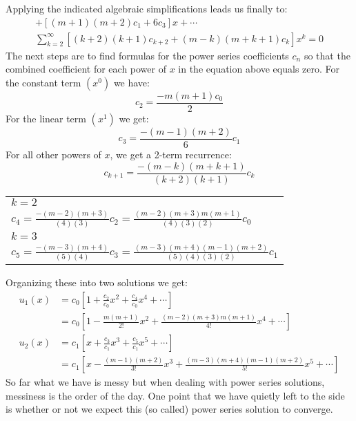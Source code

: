 Applying the indicated algebraic simplifications leads us finally to:
\begin{multline*}
[m(m+1)c_0+2c_2] + [(m+1)(m+2)c_1 + 6c_3]x + \cdots \\
\sum\limits_{k=2}^{\infty}[(k+2)(k+1)c_{k+2} + (m-k)(m+k+1)c_k]x^k=0
\end{multline*}
The next steps are to find formulas for the power series coefficients $c_n$ so that the combined coefficient for each power of $x$ in the equation above equals zero. For the constant term $(x^0)$ we have:
\begin{equation*}
c_2 = \frac{-m(m+1)c_0}{2}
\end{equation*}
For the linear term $(x^1)$ we get:
\begin{equation*}
c_3 = \frac{-(m-1)(m+2)}{6}c_1
\end{equation*}
For all other powers of $x$, we get a 2-term recurrence:
\begin{equation*}
c_{k+1} = \frac{-(m-k)(m+k+1)}{(k+2)(k+1)}c_k
\end{equation*}
\begin{margintable}
\begin{tabular}{l}
$k=2$ \\
$c_4 = \frac{-(m-2)(m+3)}{(4)(3)}c_2 = \frac{(m-2)(m+3)m(m+1)}{(4)(3)(2)}c_0$ \\
$k=3$ \\
$c_5 = \frac{-(m-3)(m+4)}{(5)(4)}c_3 = \frac{(m-3)(m+4)(m-1)(m+2)}{(5)(4)(3)(2)}c_1$ \\
\end{tabular}
\end{margintable}
Organizing these into two solutions we get:
\begin{align*}
u_1(x) &= c_0\left[1 + \frac{c_2}{c_0}x^2 + \frac{c_4}{c_0}x^4 + \cdots \right] \\
&= c_0 \left[1-\frac{m(m+1)}{2!}x^2 + \frac{(m-2)(m+3)m(m+1)}{4!}x^4 + \cdots  \right] \\
u_2(x) &= c_1\left[x + \frac{c_3}{c_1}x^3 + \frac{c_5}{c_1}x^5 + \cdots \right] \\
&= c_1\left[x - \frac{(m-1)(m+2)}{3!}x^3+\frac{(m-3)(m+4)(m-1)(m+2)}{5!}x^5 + \cdots \right]
\end{align*}
So far what we have is messy but when dealing with power series solutions, messiness is the order of the day.  One point that we have quietly left to the side is whether or not we expect this (so called) power series solution  to converge.

